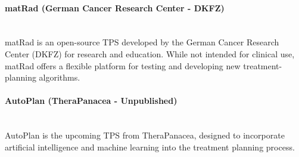 \paragraph{matRad (German Cancer Research Center - DKFZ)}
\ \\
matRad \cite{matrad} is an open-source TPS developed by the German Cancer Research Center (DKFZ) for research and education.
While not intended for clinical use, matRad offers a flexible platform for testing and developing new treatment-planning algorithms.

\paragraph{AutoPlan (TheraPanacea - Unpublished)}
\ \\
AutoPlan is the upcoming TPS from TheraPanacea, designed to incorporate artificial intelligence and machine learning into the treatment planning process.

